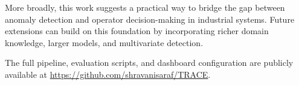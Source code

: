\documentclass[11pt, a4paper]{article}
\begin{document}
More broadly, this work suggests a practical way to bridge the gap 
between anomaly detection and operator decision-making in industrial 
systems. Future extensions can build on this foundation by incorporating 
richer domain knowledge, larger models, and multivariate detection.

The full pipeline, evaluation scripts, and dashboard configuration are 
publicly available at 
\url{https://github.com/shravanisaraf/TRACE}.



\end{document}
